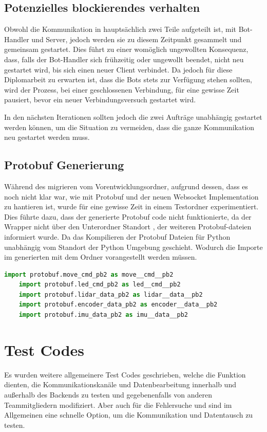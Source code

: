 \subsection{Potenzielles blockierendes verhalten}
Obwohl die Kommunikation in hauptsächlich zwei Teile aufgeteilt ist, 
mit Bot-Handler und Server, 
jedoch werden sie zu diesem Zeitpunkt gesammelt und gemeinsam gestartet.
Dies führt zu einer womöglich ungewollten Konsequenz,
dass, falls der Bot-Handler sich frühzeitig oder ungewollt beendet, 
nicht neu gestartet wird, bis sich einen neuer Client verbindet.
% 
Da jedoch für diese Diplomarbeit zu erwarten ist, 
dass die Bots stets zur Verfügung stehen sollten,
wird der Prozess, bei einer geschlossenen Verbindung,
für eine gewisse Zeit pausiert, bevor ein neuer Verbindungsversuch gestartet wird.

In den nächsten Iterationen sollten jedoch 
die zwei Aufträge unabhängig gestartet werden können, 
um die Situation zu vermeiden, dass die ganze Kommunikation neu gestartet werden muss.

\subsection{Protobuf Generierung}
Während des migrieren vom Vorentwicklungsordner, 
aufgrund dessen, dass es noch nicht klar war, wie mit Protobuf 
und der neuen Websocket Implementation zu hantieren ist, 
wurde für eine gewisse Zeit in einem Testordner experimentiert.
Dies führte dazu, dass der generierte Protobuf code nicht funktionierte,
da der Wrapper nicht über den Unterordner Standort , 
der weiteren Protobuf-dateien informiert wurde.
Da das Kompilieren der Protobuf Dateien für Python unabhängig vom Standort
der Python Umgebung geschieht. 
Wodurch die Importe im generierten 
mit dem Ordner vorangestellt werden müssen.

\begin{lstlisting}[language=python, gobble=4]
    import protobuf.move_cmd_pb2 as move__cmd__pb2
    import protobuf.led_cmd_pb2 as led__cmd__pb2
    import protobuf.lidar_data_pb2 as lidar__data__pb2
    import protobuf.encoder_data_pb2 as encoder__data__pb2
    import protobuf.imu_data_pb2 as imu__data__pb2
\end{lstlisting}


\section{Test Codes}
Es wurden weitere allgemeinere Test Codes geschrieben, 
welche die Funktion dienten, die Kommunikationskanäle und Datenbearbeitung innerhalb 
und außerhalb des Backends zu testen und gegebenenfalls 
von anderen Teammitgliedern modifiziert.
% 
Aber auch für die Fehlersuche 
und sind im Allgemeinen eine schnelle Option, 
um die Kommunikation und Datentausch zu testen.

